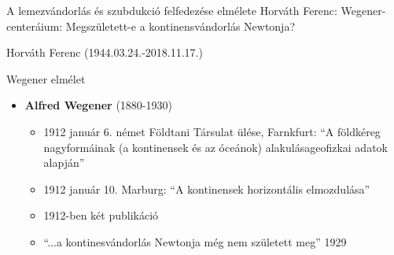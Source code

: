 \begin{frame}{A lemezvándorlás és szubdukció felfedezése elmélete}
    Horváth Ferenc: Wegener-centeráium: Megszületett-e a kontinensvándorlás Newtonja? \cite{horvath}
    \vspace{10pt}
    
    \pause
    
    \begin{center}
    \begin{minipage}[c]{0.625\textwidth}
        \centering
        
        Horváth Ferenc (1944.03.24.-2018.11.17.)
    \end{minipage}
    \end{center}
\end{frame}


\begin{frame}{Wegener elmélet}
    \begin{itemize}
        \item \textbf{Alfred Wegener} (1880-1930)
        \begin{itemize}
            \item 1912 január 6. német Földtani Társulat ülése, Farnkfurt: ``A földkéreg nagyformáinak (a kontinensek és az óceánok) alakulásageofizkai adatok alapján''
            \item 1912 január 10. Marburg: ``A kontinensek horizontális elmozdulása''
            \item 1912-ben két publikáció
            \item ``...a kontinesvándorlás Newtonja még nem született meg'' 1929
        \end{itemize}
    \end{itemize}
\end{frame}


